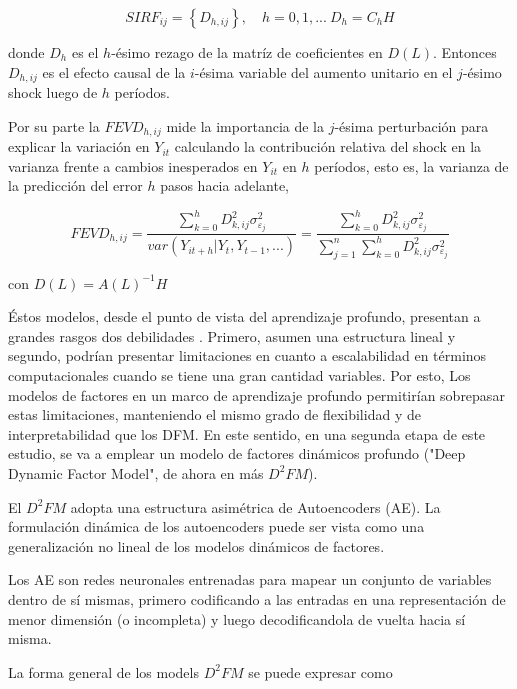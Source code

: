 \documentclass[a4paper,twoside,15pt]{article}
\begin{document}
\begin{equation*}
SIRF_{ij}=\left\{ D_{h,ij}\right\},\quad h=0,1,...\:D_h=C_hH
\label{eq:f24}\tag{12}
\end{equation*} 

donde $D_h$ es el $h$-ésimo rezago de la matríz de coeficientes en $D(L)$. Entonces $ D_{h,ij}$ es el efecto causal de la $i$-ésima variable del aumento unitario en el $j$-ésimo shock luego de $h$ períodos. 

Por su parte la $FEVD_{h,ij}$ mide la importancia de la $j$-ésima perturbación para explicar la variación en $Y_{it}$ calculando la contribución relativa del shock en la varianza frente a cambios inesperados en $Y_{it}$ en $h$ períodos, esto es, la varianza de la predicción del error $h$ pasos hacia adelante,

\begin{equation*}
	FEVD_{h,ij}= \frac{\sum_{k=0}^{h} D^2_{k,ij}\sigma^2_{\varepsilon_j}}{var(Y_{it+h}|Y_{t},Y_{t-1},...)}=\frac{\sum_{k=0}^{h} D^2_{k,ij}\sigma^2_{\varepsilon_j}}{\sum_{j=1}^{n}\sum_{k=0}^{h}D^2_{k,ij}\sigma^2_{\varepsilon_j}}
	\label{eq:f24}\tag{12}
\end{equation*}

con $D(L)=A(L)^{-1}H$

Éstos modelos, desde el punto de vista del aprendizaje profundo, presentan a grandes rasgos dos debilidades . Primero, asumen una estructura lineal y segundo, 
podrían presentar limitaciones en cuanto a escalabilidad en términos computacionales cuando se tiene una gran cantidad variables. Por esto, Los modelos de factores en un marco de aprendizaje profundo permitirían sobrepasar estas limitaciones, manteniendo el mismo grado de flexibilidad y de interpretabilidad que los DFM. En este sentido, en una segunda etapa de este estudio, se va a emplear un modelo de factores dinámicos profundo ("Deep Dynamic Factor Model", de ahora en más $D^2FM$). 

El $D^2FM$ adopta una estructura asimétrica de Autoencoders (AE). La formulación dinámica de los autoencoders puede ser vista como una generalización no lineal de los modelos dinámicos de factores.

Los AE son redes neuronales entrenadas para mapear un conjunto de variables dentro de sí mismas, primero codificando a las entradas en una representación de menor dimensión (o incompleta) y luego decodificandola de vuelta hacia sí misma. 


La forma general de los models $D^2FM$ se puede expresar como
\end{document}
